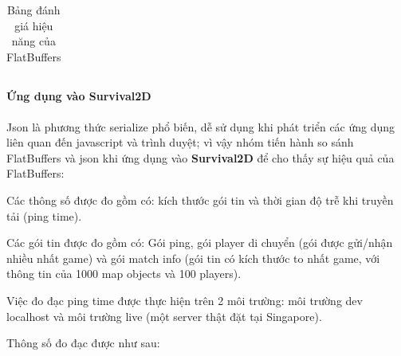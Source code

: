 \documentclass[12pt,a4paper]{article}
\begin{document}
\begin{landscape}
\begin{table}[H]
\begin{tabular}{|c|c|c|c|c|c|c|}
\end{tabular}
\caption{Bảng đánh giá hiệu năng của FlatBuffers\protect\footnotemark}
\end{table}
\end{landscape}

  \paragraph{Ứng dụng vào Survival2D}\label{test_ping}\mbox{}

   Json là phương thức serialize phổ biến, dễ sử dụng khi phát triển các ứng dụng liên quan đến javascript và trình duyệt; vì vậy nhóm tiến hành so sánh FlatBuffers và json khi ứng dụng vào \textbf{Survival2D} để cho thấy sự hiệu quả của FlatBuffers:
   
   Các thông số được đo gồm có: kích thước gói tin và thời gian độ trễ khi truyền tải (ping time).
   
   Các gói tin được đo gồm có: Gói ping, gói player di chuyển (gói được gửi/nhận nhiều nhất game) và gói match info (gói tin có kích thước to nhất game, với thông tin của 1000 map objects và 100 players).
   
   Việc đo đạc ping time được thực hiện trên 2 môi trường: môi trường dev localhost và môi trường live (một server thật đặt tại Singapore).
   
   Thông số đo đạc được như sau:
\end{document}
